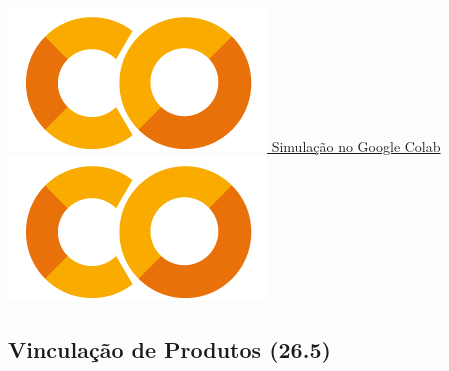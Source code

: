 \documentclass[a4paper,11pt,oneside]{book}
\theoremstyle{definition}
\theoremstyle{break}
\begin{document}
\begin{center}
\\
\ 
\\
\href{https://drive.google.com/file/d/10zbnTsvdiLaHEYt3q8ShhJlkW7q1QVzG/view?usp=sharing}{\includegraphics[scale=0.08]{_colab_logo.png} Simulação no Google Colab \includegraphics[scale=0.08]{_colab_logo.png}}
\end{center}

\subsection*{Vinculação de Produtos (26.5)}
\end{document}
